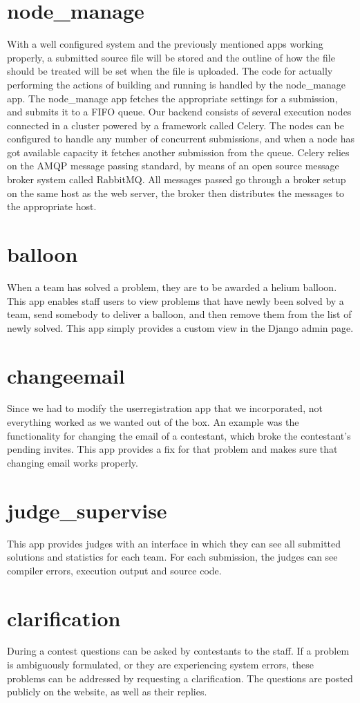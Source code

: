 \section{node\_manage}
With a well configured system and the previously mentioned apps working
properly, a submitted source file will be stored and the outline of how
the file should be treated will be set when the file is uploaded. The
code for actually performing the actions of building and running is
handled by the node\_manage app. The node\_manage app fetches the
appropriate settings for a submission, and submits it to a FIFO queue.
Our backend consists of several execution nodes connected in a cluster
powered by a framework called Celery. The nodes can be configured to
handle any number of concurrent submissions, and when a node has got
available capacity it fetches another submission from the queue. Celery
relies on the AMQP message passing standard, by means of an open source
message broker system called RabbitMQ. All messages passed go through a
broker setup on the same host as the web server, the broker then
distributes the messages to the appropriate host. 

\section{balloon}
When a team has solved a problem, they are to be awarded a helium
balloon. This app enables staff users to view problems that have newly
been solved by a team, send somebody to deliver a balloon, and then
remove them from the list of newly solved. This app simply provides
a custom view in the Django admin page.

\section{changeemail}
Since we had to modify the userregistration app that we incorporated,
not everything worked as we wanted out of the box. An example was
the functionality for changing the email of a contestant, which broke 
the contestant's pending invites. This app provides a fix for that
problem and makes sure that changing email works properly.

\section{judge\_supervise}
This app provides judges with an interface in which they can see all
submitted solutions and statistics for each team. For each submission,
the judges can see compiler errors, execution output and source code. 

\section{clarification}
During a contest questions can be asked by contestants to the staff. If
a problem is ambiguously formulated, or they are experiencing system
errors, these problems can be addressed by requesting a clarification.
The questions are posted publicly on the website, as well as their replies. \ 

